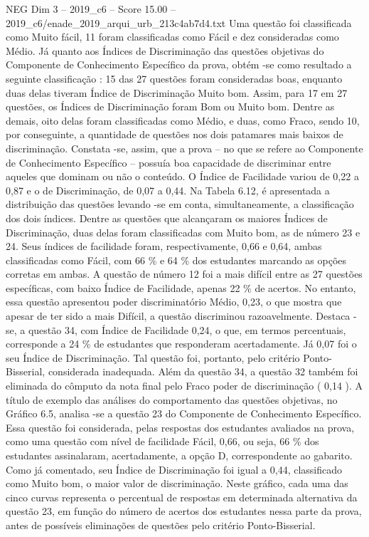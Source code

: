 \begin{textsample}{NEG Dim 3 – 2019\_c6 – Score 15.00 – 2019\_c6/enade\_2019\_arqui\_urb\_213c4ab7d4.txt}
Uma questão foi classificada como Muito fácil, 11 foram classificadas como Fácil e dez consideradas como Médio.
Já quanto aos Índices de Discriminação das questões objetivas do Componente de Conhecimento Específico da prova, obtém -se como resultado a seguinte classificação : 15 das 27 questões foram consideradas boas, enquanto duas delas tiveram Índice de Discriminação Muito bom.
Assim, para 17 em 27 questões, os Índices de Discriminação foram Bom ou Muito bom.
Dentre as demais, oito delas foram classificadas como Médio, e duas, como Fraco, sendo 10, por conseguinte, a quantidade de questões nos dois patamares mais baixos de discriminação.
Constata -se, assim, que a prova – no que se refere ao Componente de Conhecimento Específico – possuía boa capacidade de discriminar entre aqueles que dominam ou não o conteúdo.
O Índice de Facilidade variou de 0,22 a 0,87 e o de Discriminação, de 0,07 a 0,44.
Na Tabela 6.12, é apresentada a distribuição das questões levando -se em conta, simultaneamente, a classificação dos dois índices.
Dentre as questões que alcançaram os maiores Índices de Discriminação, duas delas foram classificadas com Muito bom, as de número 23 e 24.
Seus índices de facilidade foram, respectivamente, 0,66 e 0,64, ambas classificadas como Fácil, com 66 \% e 64 \% dos estudantes marcando as opções corretas em ambas.
A questão de número 12 foi a mais difícil entre as 27 questões específicas, com baixo Índice de Facilidade, apenas 22 \% de acertos.
No entanto, essa questão apresentou poder discriminatório Médio, 0,23, o que mostra que apesar de ter sido a mais Difícil, a questão discriminou razoavelmente.
Destaca -se, a questão 34, com Índice de Facilidade 0,24, o que, em termos percentuais, corresponde a 24 \% de estudantes que responderam acertadamente.
Já 0,07 foi o seu Índice de Discriminação.
Tal questão foi, portanto, pelo critério Ponto-Bisserial, considerada inadequada.
Além da questão 34, a questão 32 também foi eliminada do cômputo da nota final pelo Fraco poder de discriminação ( 0,14 ).
A título de exemplo das análises do comportamento das questões objetivas, no Gráfico 6.5, analisa -se a questão 23 do Componente de Conhecimento Específico.
Essa questão foi considerada, pelas respostas dos estudantes avaliados na prova, como uma questão com nível de facilidade Fácil, 0,66, ou seja, 66 \% dos estudantes assinalaram, acertadamente, a opção D, correspondente ao gabarito.
Como já comentado, seu Índice de Discriminação foi igual a 0,44, classificado como Muito bom, o maior valor de discriminação.
Neste gráfico, cada uma das cinco curvas representa o percentual de respostas em determinada alternativa da questão 23, em função do número de acertos dos estudantes nessa parte da prova, antes de possíveis eliminações de questões pelo critério Ponto-Bisserial.

\end{textsample}
